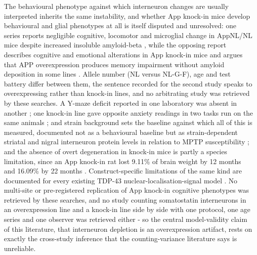 \documentclass[11pt]{article}
\begin{document}
The behavioural phenotype against which interneuron changes are usually interpreted inherits the same instability, and whether App knock-in mice develop behavioural and glial phenotypes at all is itself disputed and unresolved: one series reports negligible cognitive, locomotor and microglial change in AppNL/NL mice despite increased insoluble amyloid-beta \citep{Salas2018}, while the opposing report describes cognitive and emotional alterations in App knock-in mice and argues that APP overexpression produces memory impairment without amyloid deposition in some lines \citep{Sakakibara2018}. Allele number (NL versus NL-G-F), age and test battery differ between them, the sentence recorded for the second study speaks to overexpressing rather than knock-in lines, and no arbitrating study was retrieved by these searches. A Y-maze deficit reported in one laboratory was absent in another \citep{Jacob2019}; one knock-in line gave opposite anxiety readings in two tasks run on the same animals \citep{Pervolaraki2019}; and strain background sets the baseline against which all of this is measured, documented not as a behavioural baseline but as strain-dependent striatal and nigral interneuron protein levels in relation to MPTP susceptibility \citep{Bhaduri2018}; and the absence of overt degeneration in knock-in mice is partly a species limitation, since an App knock-in rat lost 9.11\% of brain weight by 12 months and 16.09\% by 22 months \citep{Pang2021}. Construct-specific limitations of the same kind are documented for every existing TDP-43 nuclear-localisation-signal model \citep{Mitra2025}. No multi-site or pre-registered replication of App knock-in cognitive phenotypes was retrieved by these searches, and no study counting somatostatin interneurons in an overexpression line and a knock-in line side by side with one protocol, one age series and one observer was retrieved either - so the central model-validity claim of this literature, that interneuron depletion is an overexpression artifact, rests on exactly the cross-study inference that the counting-variance literature says is unreliable.
\end{document}

